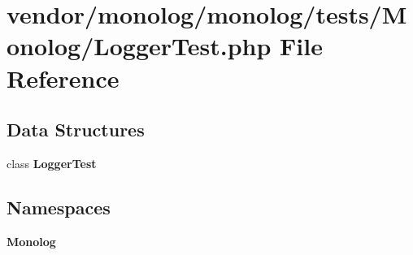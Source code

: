 \section{vendor/monolog/monolog/tests/\+Monolog/\+Logger\+Test.php File Reference}
\label{_logger_test_8php}
\subsection*{Data Structures}
\begin{DoxyCompactItemize}
\item 
class {\bf Logger\+Test}
\end{DoxyCompactItemize}
\subsection*{Namespaces}
\begin{DoxyCompactItemize}
\item 
 {\bf Monolog}
\end{DoxyCompactItemize}
